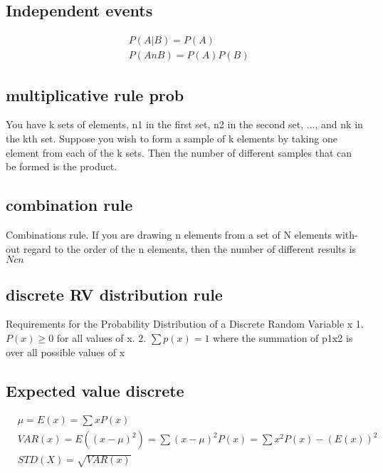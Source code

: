 \documentclass[fontsize=6pt, paper=a4]{scrartcl}
\begin{document}
\begin{multicols*}{4}
\subsection{Independent events}
\begin{align}
	&P(A|B)=P(A)\\
	&P(AnB)=P(A)P(B)
\end{align}

\subsection{multiplicative rule prob}
You have k sets of elements, n1 in the first set, n2 in the second set, ..., and nk in the kth set. Suppose you wish to form a sample of k elements by taking one element from each of the k sets. Then the number of different samples that can be formed is the product.

\subsection{combination rule}
Combinations rule. If you are drawing n elements from a set of N elements with-
out regard to the order of the n elements, then the number of different results is $Ncn$

\subsection{discrete RV distribution rule}
  
Requirements for the Probability Distribution of a Discrete Random Variable x 1. $P(x)\geq 0$ for all values of x.
2. $\sum p(x) = 1$
where the summation of p1x2 is over all possible values of x

\subsection{Expected value discrete}
\begin{align}
	&\mu=E(x)=\sum x P(x)\\
	&VAR(x)=E((x-\mu)^2)=\sum (x-\mu)^2P(x)=\sum x^2P(x)-(E(x))^2\\
	&STD(X)=\sqrt{VAR(x)}
\end{align}

\end{multicols*}
\end{document}
